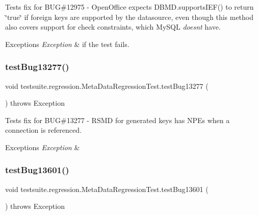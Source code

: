 Tests fix for B\+UG\#12975 -\/ Open\+Office expects D\+B\+M\+D.\+supports\+I\+E\+F() to return \char`\"{}true\char`\"{} if foreign keys are supported by the datasource, even though this method also covers support for check constraints, which My\+S\+QL {\itshape doesn\textquotesingle{}t} have.


\begin{DoxyExceptions}{Exceptions}
{\em Exception} & if the test fails. \\
\hline
\end{DoxyExceptions}
\mbox{\label{classtestsuite_1_1regression_1_1_meta_data_regression_test_a0c675c284ad20892d31732b73f09e7c6}} 
\subsubsection{\texorpdfstring{test\+Bug13277()}{testBug13277()}}
{\footnotesize\ttfamily void testsuite.\+regression.\+Meta\+Data\+Regression\+Test.\+test\+Bug13277 (\begin{DoxyParamCaption}{ }\end{DoxyParamCaption}) throws Exception}

Tests fix for B\+UG\#13277 -\/ R\+S\+MD for generated keys has N\+P\+Es when a connection is referenced.


\begin{DoxyExceptions}{Exceptions}
{\em Exception} & \\
\hline
\end{DoxyExceptions}
\mbox{\label{classtestsuite_1_1regression_1_1_meta_data_regression_test_a9f064453a9a5087f0e60300320e2f041}} 
\subsubsection{\texorpdfstring{test\+Bug13601()}{testBug13601()}}
{\footnotesize\ttfamily void testsuite.\+regression.\+Meta\+Data\+Regression\+Test.\+test\+Bug13601 (\begin{DoxyParamCaption}{ }\end{DoxyParamCaption}) throws Exception}

